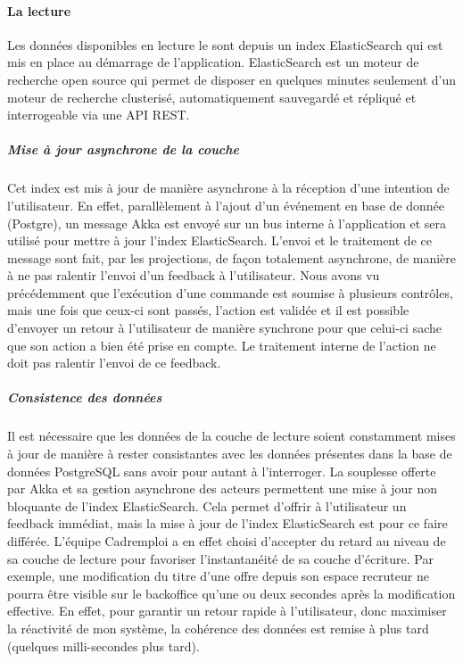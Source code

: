 \paragraph{La lecture}
\label{par:La lecture}
Les données disponibles en lecture le sont depuis un index ElasticSearch qui est mis en place au démarrage de l'application.
\label{def:ElasticSearch}ElasticSearch est un moteur de recherche open source qui permet de disposer en quelques minutes seulement d'un moteur de recherche clusterisé, automatiquement sauvegardé et répliqué et interrogeable via une API REST.
\subparagraph{Mise à jour asynchrone de la couche}
Cet index est mis à jour de manière asynchrone à la réception d'une intention de l'utilisateur.
En effet, parallèlement à l'ajout d'un événement en base de donnée (Postgre), un message Akka est envoyé sur un bus interne à l'application et sera utilisé pour mettre à jour l'index ElasticSearch.
L'envoi et le traitement de ce message sont fait, par les projections, de façon totalement asynchrone, de manière à ne pas ralentir l'envoi d'un feedback à l'utilisateur.
Nous avons vu précédemment que l'exécution d'une commande est soumise à plusieurs contrôles, mais une fois que ceux-ci sont passés, l'action est validée et il est possible d'envoyer un retour à l'utilisateur de manière synchrone pour que celui-ci sache que son action a bien été prise en compte.
Le traitement interne de l'action ne doit pas ralentir l'envoi de ce feedback.
\subparagraph{Consistence des données}
Il est nécessaire que les données de la couche de lecture soient constamment mises à jour de manière à rester consistantes avec les données présentes dans la base de données PostgreSQL sans avoir pour autant à l'interroger.
La souplesse offerte par Akka et sa gestion asynchrone des acteurs permettent une mise à jour non bloquante de l'index ElasticSearch.
Cela permet d'offrir à l'utilisateur un feedback immédiat, mais la mise à jour de l'index ElasticSearch est pour ce faire différée.
L'équipe Cadremploi a en effet choisi d'accepter du retard au niveau de sa couche de lecture pour favoriser l'instantanéité de sa couche d'écriture.
Par exemple, une modification du titre d'une offre depuis son espace recruteur ne pourra être visible sur le backoffice qu'une ou deux secondes après la modification effective.
En effet, pour garantir un retour rapide à l'utilisateur, donc maximiser la réactivité de mon système, la cohérence des données est remise à plus tard (quelques milli-secondes plus tard).

